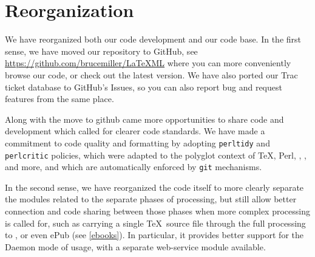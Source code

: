 \documentclass{llncs}
\begin{document}

\section{Reorganization}\label{reorganization}
We have reorganized both our code development and our code base.
In the first sense, we have moved our repository to GitHub,
see \url{https://github.com/brucemiller/LaTeXML}
where you can more conveniently browse our code, or check out the latest version.
We have also ported our Trac ticket database to GitHub's Issues,
so you can also report bug and request features from the same place.

Along with the move to github came more opportunities to share
code and development which called for clearer code standards.
We have made a commitment to code quality and formatting by
adopting \texttt{perltidy} and \texttt{perlcritic} policies,
which were adapted to the polyglot context of \TeX, Perl, \XML,
\XSLT, and more, and which are automatically enforced by \texttt{git} mechanisms.

In the second sense, we have reorganized the code itself to more clearly
separate the modules related to the separate phases of processing,
but still allow better connection and code sharing between those phases when more
complex processing is called for, such as carrying a single \TeX\ source
file through the full processing to \HTML, or even ePub (see \ref{ebooks}).
In particular, it provides better support for the Daemon mode of
usage, with a separate web-service module available.
\end{document}
